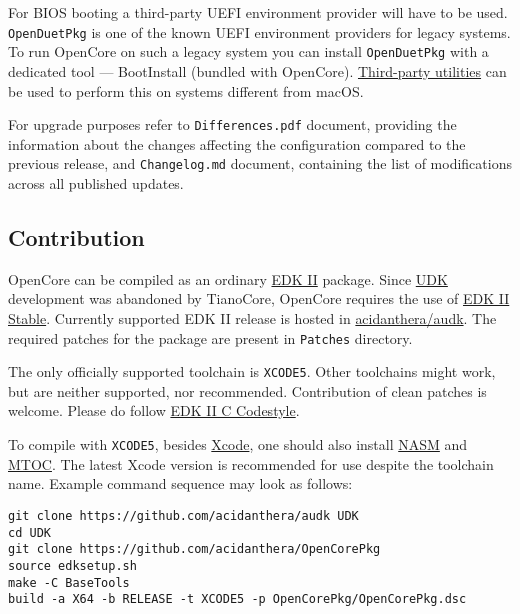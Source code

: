 \documentclass[]{article}
\begin{document}
For BIOS booting a third-party UEFI environment provider will have to
be used. \texttt{OpenDuetPkg} is one of the known UEFI environment providers
for legacy systems. To run OpenCore on such a legacy system you can install
\texttt{OpenDuetPkg} with a dedicated tool --- BootInstall (bundled with OpenCore).
\href{https://github.com/corpnewt/gibMacOS}{Third-party utilities} can be used to
perform this on systems different from macOS.

For upgrade purposes refer to \texttt{Differences.pdf} document, providing
the information about the changes affecting the configuration compared
to the previous release, and \texttt{Changelog.md} document, containing
the list of modifications across all published updates.

\subsection{Contribution}\label{configuration-comp}

OpenCore can be compiled as an ordinary
\href{https://github.com/tianocore/tianocore.github.io/wiki/EDK-II}{EDK II} package.
Since \href{https://github.com/tianocore/tianocore.github.io/wiki/UDK}{UDK}
development was abandoned by TianoCore, OpenCore requires the use of
\href{https://github.com/tianocore/tianocore.github.io/wiki/EDK-II#stable-tags}{EDK II Stable}.
Currently supported EDK II release is hosted in
\href{https://github.com/acidanthera/audk}{acidanthera/audk}. The required patches
for the package are present in \texttt{Patches} directory.

The only officially supported toolchain is \texttt{XCODE5}. Other toolchains
might work, but are neither supported, nor recommended. Contribution of clean
patches is welcome. Please do follow
\href{https://github.com/tianocore/tianocore.github.io/wiki/Code-Style-C}{EDK II C Codestyle}.

To compile with \texttt{XCODE5}, besides \href{https://developer.apple.com/xcode}{Xcode},
one should also install \href{https://www.nasm.us}{NASM} and
\href{https://github.com/acidanthera/ocbuild/tree/master/external}{MTOC}.
The latest Xcode version is recommended for use despite the toolchain name. Example
command sequence may look as follows:

\begin{lstlisting}[caption=Compilation Commands, label=compile, style=ocbash]
git clone https://github.com/acidanthera/audk UDK
cd UDK
git clone https://github.com/acidanthera/OpenCorePkg
source edksetup.sh
make -C BaseTools
build -a X64 -b RELEASE -t XCODE5 -p OpenCorePkg/OpenCorePkg.dsc
\end{lstlisting}
\end{document}

